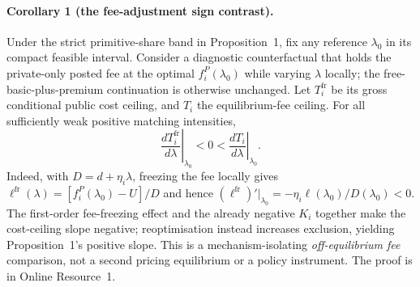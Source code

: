 \paragraph{Corollary 1 (the fee-adjustment sign contrast).}\label{cor:repricing}
Under the strict primitive-share band in Proposition~1, fix any reference
$\lambda_0$ in its compact feasible interval. Consider a diagnostic
counterfactual that holds the private-only posted fee at the optimal
$f_i^P(\lambda_0)$ while varying $\lambda$ locally; the free-basic-plus-premium
continuation is otherwise unchanged. Let $T_i^{\mathrm{fr}}$ be its gross
conditional public cost ceiling, and $T_i$ the equilibrium-fee ceiling.
For all sufficiently weak positive matching intensities,
\begin{equation}
 \left.\frac{dT_i^{\mathrm{fr}}}{d\lambda}\right|_{\lambda_0}<0
 <\left.\frac{dT_i}{d\lambda}\right|_{\lambda_0}.
 \label{eq:repricing-reversal}
\end{equation}
Indeed, with $D=d+\eta_i\lambda$, freezing the fee locally gives
$\ell^{\mathrm{fr}}(\lambda)=
[f_i^P(\lambda_0)-U]/D$ and hence
$(\ell^{\mathrm{fr}})'|_{\lambda_0}=-\eta_i\ell(\lambda_0)/D(\lambda_0)<0$.
The first-order fee-freezing effect and the already negative
$K_i$ together make the cost-ceiling slope negative;
reoptimisation instead increases exclusion, yielding Proposition~1's
positive slope. This is a mechanism-isolating \emph{off-equilibrium fee}
comparison, not a second pricing equilibrium or a policy instrument.
The proof is in Online Resource~1.

